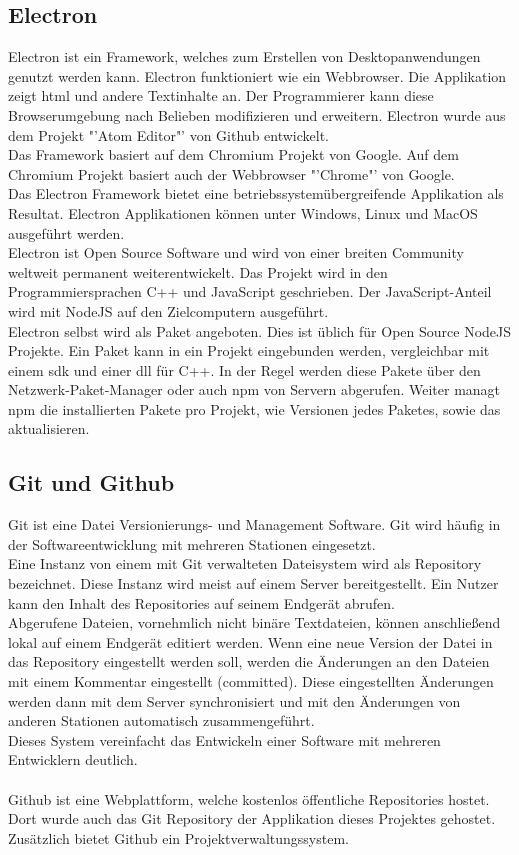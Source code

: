\documentclass[11pt]{scrartcl}
\begin{document}
\subsection{Electron}
Electron ist ein Framework, welches zum Erstellen von Desktopanwendungen genutzt werden kann. Electron funktioniert
wie ein Webbrowser. Die Applikation zeigt \ac{html} und andere Textinhalte an.\cite{electron} Der Programmierer kann diese
Browserumgebung nach Belieben modifizieren und erweitern. Electron wurde aus dem Projekt "'Atom Editor"' von Github entwickelt.\\
Das Framework basiert auf dem Chromium Projekt von Google. Auf dem Chromium Projekt basiert auch der Webbrowser "'Chrome"' von
Google.\\
Das Electron Framework bietet eine betriebssystemübergreifende Applikation als Resultat. Electron Applikationen können unter
Windows, Linux und MacOS ausgeführt werden.\\
Electron ist Open Source Software und wird von einer breiten Community weltweit permanent weiterentwickelt.\cite{electron} Das Projekt wird
in den Programmiersprachen C++ und JavaScript geschrieben. Der JavaScript-Anteil wird mit NodeJS auf den Zielcomputern ausgeführt.\\
Electron selbst wird als Paket angeboten. Dies ist üblich für Open Source NodeJS Projekte. Ein Paket kann in ein Projekt eingebunden werden,
vergleichbar mit einem \ac{sdk} und einer \ac{dll} für C++. In der Regel werden diese Pakete über den Netzwerk-Paket-Manager oder auch \ac{npm} von
Servern abgerufen. Weiter managt \ac{npm} die installierten Pakete pro Projekt, wie Versionen jedes Paketes, sowie das aktualisieren.

\subsection{Git und Github}
Git ist eine Datei Versionierungs- und Management Software. Git wird häufig in der Softwareentwicklung mit mehreren Stationen eingesetzt.\\
Eine Instanz von einem mit Git verwalteten Dateisystem wird als Repository bezeichnet. Diese Instanz wird meist auf einem Server bereitgestellt.
Ein Nutzer kann den Inhalt des Repositories auf seinem Endgerät abrufen.\\
Abgerufene Dateien, vornehmlich nicht binäre Textdateien, können anschließend lokal auf einem Endgerät editiert werden. Wenn eine neue Version
der Datei in das Repository eingestellt werden soll, werden die Änderungen an den Dateien mit einem Kommentar eingestellt (committed).
Diese eingestellten Änderungen werden dann mit dem Server synchronisiert und mit den Änderungen von anderen Stationen automatisch zusammengeführt.\\
Dieses System vereinfacht das Entwickeln einer Software mit mehreren Entwicklern deutlich.\\
\\
Github ist eine Webplattform, welche kostenlos öffentliche Repositories hostet. Dort wurde auch das Git Repository der Applikation
dieses Projektes gehostet.\\
Zusätzlich bietet Github ein Projektverwaltungssystem.
\clearpage
\end{document}
